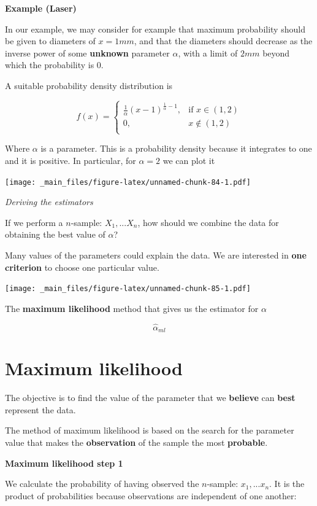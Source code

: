\documentclass[
]{book}
\begin{document}
\textbf{Example (Laser)}

In our example, we may consider for example that maximum probability should be given to diameters of \(x=1mm\), and that the diameters should decrease as the inverse power of some \textbf{unknown} parameter \(\alpha\), with a limit of \(2mm\) beyond which the probability is \(0\).

A suitable probability density distribution is

\[
    f(x)= 
\begin{cases}
\frac{1}{\alpha}(x-1)^{\frac{1}{\alpha}-1},& \text{if } x \in (1,2)\\
    0,& x \notin (1,2)\\
\end{cases}
\]

Where \(\alpha\) is a parameter. This is a probability density because it integrates to one and it is positive. In particular, for \(\alpha=2\) we can plot it

\texttt{[image: \_main\_files/figure-latex/unnamed-chunk-84-1.pdf]}

\emph{Deriving the estimators}

If we perform a \(n\)-sample: \(X_1,...X_n\), how should we combine the data for obtaining the best value of \(\alpha\)?

Many values of the parameters could explain the data. We are interested in \textbf{one criterion} to choose one particular value.

\texttt{[image: \_main\_files/figure-latex/unnamed-chunk-85-1.pdf]}

The \textbf{maximum likelihood} method that gives us the estimator for \(\alpha\)

\[\hat{\alpha}_{ml}\]

\hypertarget{maximum-likelihood-2}{%
\section{Maximum likelihood}\label{maximum-likelihood-2}}

The objective is to find the value of the parameter that we \textbf{believe} can \textbf{best} represent the data.

The method of maximum likelihood is based on the search for the parameter value that makes the \textbf{observation} of the sample the most \textbf{probable}.

\textbf{Maximum likelihood step 1}

We calculate the probability of having observed the \(n\)-sample: \(x_1,...x_n\). It is the product of probabilities because observations are independent of one another:
\end{document}
